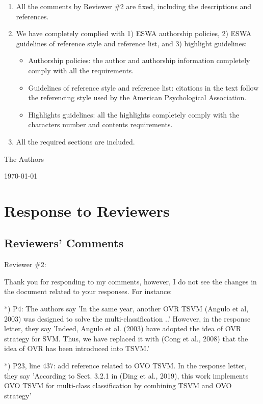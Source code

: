 \documentclass[12pt, review]{elsarticle}
\def\mycoauthor{The Authors}
\def\mydate{\today} %
\begin{document}
\begin{enumerate}
\item All the comments by Reviewer \#2 are fixed, including the descriptions and references.
\item We have completely complied with 1) ESWA authorship policies,
2) ESWA guidelines of reference style and reference list, and
3) highlight guidelines:
  \begin{itemize}
    \item Authorship policies: the author and authorship information completely comply with all the requirements.
    \item Guidelines of reference style and reference list: citations in the text follow the referencing style used by the American Psychological Association.
    \item Highlights guidelines: all the highlights completely comply with the characters  number and contents requirements.
  \end{itemize}
\item All the required sections are included.
\end{enumerate}


\noindent \mycoauthor

\noindent \mydate


\section{Response to Reviewers}
\subsection{Reviewers' Comments}


Reviewer \#2:

Thank you for responding to my comments, however, I do not see the changes in the document related to your responses. For instance:

*) P4: The authors say 'In the same year, another OVR TSVM (Angulo et al, 2003) was designed to solve the multi-classification ..' However, in the response letter, they say 'Indeed, Angulo et al. (2003) have adopted the idea of OVR strategy for SVM. Thus, we have replaced it with (Cong et al., 2008) that the idea of OVR has been introduced into TSVM.'

*) P23, line 437: add reference related to OVO TSVM. In the response letter, they say 'According to Sect. 3.2.1 in (Ding et al., 2019), this work implements OVO TSVM for multi-class classification by combining TSVM and OVO strategy'
\end{document}
